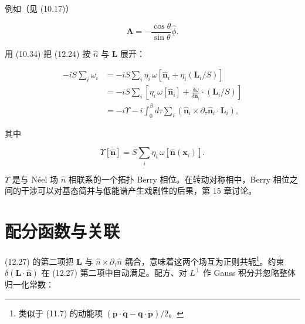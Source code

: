 例如（见 (10.17)）

\begin{equation*}
\mathbf {A} = - \frac {\cos \theta}{\sin \theta} \hat {\phi}.
\tag{12.26}
\end{equation*}

用 (10.34) 把 (12.24) 按 $\hat{n}$ 与 $\mathbf{L}$ 展开：

\begin{align*}
- i S \sum_ {i} \omega_ {i} & = - i S \sum_ {i} \eta_ {i} \, \omega \left[ \hat {\mathbf {n}} _ {i} + \eta_ {i} ( \mathbf {L} _ {i} / S ) \right]\\
& = - i S \sum_ {i} \left[ \eta_ {i} \, \omega [ \hat {\mathbf {n}} _ {i} ] + \frac {\delta \omega}{\delta \hat {\mathbf {n}} _ {i}} \cdot ( \mathbf {L} _ {i} / S ) \right]\\
& = - i \Upsilon - i \int_ {0} ^ {\beta} d \tau \sum_ {i} \left( \hat {\mathbf {n}} _ {i} \times \partial_ {\tau} \hat {\mathbf {n}} _ {i} \cdot \mathbf {L} _ {i} \right) ,
\tag{12.27}
\end{align*}

其中

\begin{equation*}
\Upsilon [ \hat {\mathbf {n}} ] = S \sum_ {i} \eta_ {i} \, \omega [ \hat {\mathbf {n}} ( \mathbf {x} _ {i} ) ].
\tag{12.28}
\end{equation*}

$\Upsilon$ 是与 Néel 场 $\hat{n}$ 相联系的一个拓扑 Berry 相位。在转动对称相中，Berry 相位之间的干涉可以对基态简并与低能谱产生戏剧性的后果，第 15 章讨论。

\section{配分函数与关联}

(12.27) 的第二项把 $\mathbf{L}$ 与 $\hat{n} \times \partial_{\tau}\hat{n}$ 耦合，意味着这两个场互为正则共轭\footnote{类似于 (11.7) 的动能项 $(\mathbf{p} \cdot \dot{\mathbf{q}} - \mathbf{q} \cdot \dot{\mathbf{p}})/2$。}。约束 $\delta(\mathbf{L} \cdot \hat{\mathbf{n}})$ 在 (12.27) 第二项中自动满足。配方、对 $L^{\perp}$ 作 Gauss 积分并忽略整体归一化常数：

